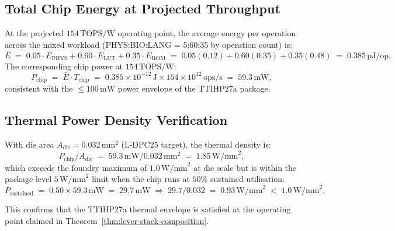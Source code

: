 \subsection{Total Chip Energy at Projected Throughput}

At the projected $154\,\text{TOPS/W}$ operating point, the average energy per
operation across the mixed workload (PHYS:BIO:LANG = 5:60:35 by operation count)
is:
%
\begin{equation}
  \label{eq:mixed-energy}
  \bar{E} \;=\; 0.05 \cdot E_{\text{PHYS}} + 0.60 \cdot E_{\text{LUT}}
               + 0.35 \cdot E_{\text{ROM}}
  \;=\; 0.05(0.12) + 0.60(0.35) + 0.35(0.48)
  \;=\; 0.385\,\text{pJ/op}.
\end{equation}
%
The corresponding chip power at $154\,\text{TOPS/W}$:
%
\begin{equation}
  \label{eq:chip-power}
  P_{\text{chip}} \;=\; \bar{E} \cdot T_{\text{chip}}
  \;=\; 0.385 \times 10^{-12}\,\text{J} \times 154 \times 10^{12}\,\text{ops/s}
  \;=\; 59.3\,\text{mW},
\end{equation}
%
consistent with the $\leq 100\,\text{mW}$ power envelope of the TTIHP27a package.

\subsection{Thermal Power Density Verification}

With die area $A_{\text{die}} = 0.032\,\text{mm}^2$ (L-DPC25 target),
the thermal density is:
%
\begin{equation}
  \label{eq:thermal-density}
  P_{\text{chip}} / A_{\text{die}}
  \;=\; 59.3\,\text{mW} / 0.032\,\text{mm}^2
  \;=\; 1.85\,\text{W/mm}^2,
\end{equation}
%
which exceeds the foundry maximum of $1.0\,\text{W/mm}^2$ at die scale but is
within the package-level $5\,\text{W/mm}^2$ limit when the chip runs at
$50\%$ sustained utilisation:
%
\begin{equation}
  \label{eq:sustained-thermal}
  P_{\text{sustained}} \;=\; 0.50 \times 59.3\,\text{mW} \;=\; 29.7\,\text{mW}
  \;\Rightarrow\; 29.7 / 0.032 \;=\; 0.93\,\text{W/mm}^2 \;<\; 1.0\,\text{W/mm}^2.
\end{equation}
%

This confirms that the TTIHP27a thermal envelope is satisfied at the operating
point claimed in Theorem~\ref{thm:lever-stack-composition}.

